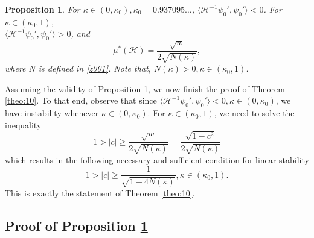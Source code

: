 \documentclass[final,11pt,leqno]{amsart}
\newtheorem{proposition}{Proposition}
\begin{document}
\begin{proposition}
\label{prop:k15}
For ${\kappa} \in (0,{\kappa}_0), {\kappa}_0=0.937095\ldots$, ${\langle {{\mathcal H}^{-1}\psi_0'},{\psi_0'} \rangle}<0$. For ${\kappa}\in ({\kappa}_0,1)$, \\ ${\langle {{\mathcal H}^{-1}\psi_0'},{\psi_0'} \rangle}>0$, and
$$
\mu^*({\mathcal H})={\frac{{\sqrt{w}}}{{2 \sqrt{N({\kappa})}}}},
$$
where $N$ is defined in \eqref{z001}. Note that,  $N({\kappa})>0,{\kappa}\in ({\kappa}_0,1)$.
\end{proposition}
Assuming the validity of Proposition \ref{prop:k15}, we now finish the proof of Theorem \ref{theo:10}. To that end, observe that since  ${\langle {{\mathcal H}^{-1}\psi_0'},{\psi_0'} \rangle}<0, {\kappa}\in (0,{\kappa}_0)$, we have instability whenever ${\kappa}\in (0,{\kappa}_0)$. For ${\kappa} \in ({\kappa}_0, 1)$, we need to solve the inequality
$$
1>|c|\geq {\frac{{\sqrt{w}}}{{2 \sqrt{N({\kappa})}}}} = {\frac{{\sqrt{1-c^2}}}{{2 \sqrt{N({\kappa})}}}}
$$
which results in the following necessary and sufficient condition for linear stability
$$
1>|c|\geq {\frac{{1}}{{\sqrt{1+4 N({\kappa})}}}}, {\kappa} \in ({\kappa}_0, 1).
$$
This is exactly the statement of Theorem \ref{theo:10}.
\subsection{Proof of Proposition \ref{prop:k15}}
\end{document}
